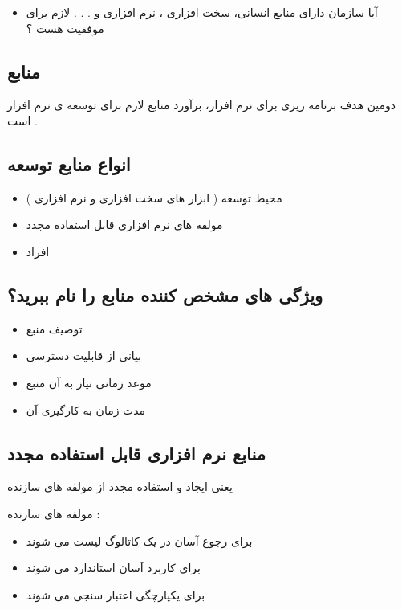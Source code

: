 \documentclass{article}
\begin{document}
\begin{itemize}
	\item آیا سازمان دارای منابع انسانی، سخت افزاری ، نرم افزاری و . . .  لازم برای موفقیت هست ؟
\end{itemize}



\subsection{منابع}

دومین هدف برنامه ریزی برای نرم افزار، برآورد منابع لازم برای توسعه ی نرم افزار است .


\subsection{انواع منابع توسعه}

\begin{itemize}
	\item محیط توسعه ( ابزار های سخت افزاری و نرم افزاری )
	\item مولفه های نرم افزاری قابل استفاده مجدد
	\item افراد
\end{itemize}



\subsection{ویژگی های مشخص کننده منابع را نام ببرید؟}

\begin{itemize}
	\item توصیف منبع
	\item بیانی از قابلیت دسترسی
	\item موعد زمانی نیاز به آن منبع
	\item مدت زمان به کارگیری آن
\end{itemize}




\subsection{منابع نرم افزاری قابل استفاده مجدد}

یعنی ایجاد و استفاده مجدد از مولفه های سازنده


مولفه های سازنده :

\begin{itemize}
	\item برای رجوع آسان در یک کاتالوگ لیست می شوند
	\item برای کاربرد آسان استاندارد می شوند
	\item برای یکپارچگی اعتبار سنجی می شوند
\end{itemize}
\end{document}

